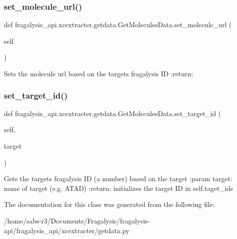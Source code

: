 \subsubsection{\texorpdfstring{set\+\_\+molecule\+\_\+url()}{set\_molecule\_url()}}
{\footnotesize\ttfamily def fragalysis\+\_\+api.\+xcextracter.\+getdata.\+Get\+Molecules\+Data.\+set\+\_\+molecule\+\_\+url (\begin{DoxyParamCaption}\item[{}]{self }\end{DoxyParamCaption})}

\begin{DoxyVerb}Sets the molecule url based on the targets fragalysis ID
:return:
\end{DoxyVerb}
 \mbox{\label{classfragalysis__api_1_1xcextracter_1_1getdata_1_1_get_molecules_data_acc782fb40405a434903f6d3e80624c9c}} 
\subsubsection{\texorpdfstring{set\+\_\+target\+\_\+id()}{set\_target\_id()}}
{\footnotesize\ttfamily def fragalysis\+\_\+api.\+xcextracter.\+getdata.\+Get\+Molecules\+Data.\+set\+\_\+target\+\_\+id (\begin{DoxyParamCaption}\item[{}]{self,  }\item[{}]{target }\end{DoxyParamCaption})}

\begin{DoxyVerb}Gets the targets fragalysis ID (a number) based on the target
:param target: name of target (e.g. ATAD)
:return: initializes the target ID in self.taget_ids
\end{DoxyVerb}
 

The documentation for this class was generated from the following file\+:\begin{DoxyCompactItemize}
\item 
/home/sabs-\/r3/\+Documents/\+Fragalysis/fragalysis-\/api/fragalysis\+\_\+api/xcextracter/getdata.\+py\end{DoxyCompactItemize}
